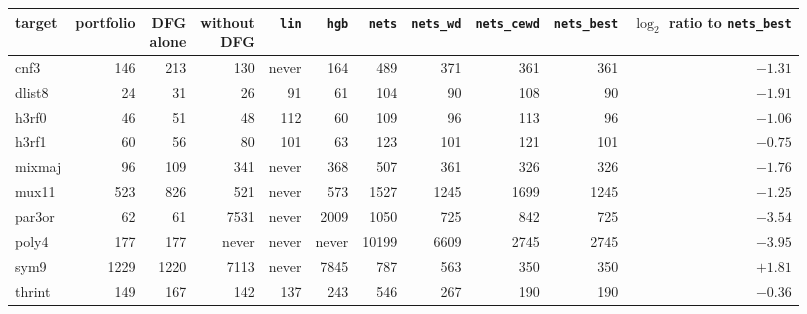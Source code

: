 \begin{tabular}{lrrrrrrrrrr}
\toprule
target & portfolio & \hd{DFG\\alone} & \hd{without\\DFG} & \texttt{lin} & \texttt{hgb} & \texttt{nets} & \texttt{nets\_wd} & \texttt{nets\_cewd} & \texttt{nets\_best} & \hd{$\log_2$ ratio to\\\texttt{nets\_best}}\\
\midrule
cnf3 & 146 & 213 & 130 & never & 164 & 489 & 371 & 361 & 361 & $-1.31$\\
dlist8 & 24 & 31 & 26 & 91 & 61 & 104 & 90 & 108 & 90 & $-1.91$\\
h3rf0 & 46 & 51 & 48 & 112 & 60 & 109 & 96 & 113 & 96 & $-1.06$\\
h3rf1 & 60 & 56 & 80 & 101 & 63 & 123 & 101 & 121 & 101 & $-0.75$\\
mixmaj & 96 & 109 & 341 & never & 368 & 507 & 361 & 326 & 326 & $-1.76$\\
mux11 & 523 & 826 & 521 & never & 573 & 1527 & 1245 & 1699 & 1245 & $-1.25$\\
par3or & 62 & 61 & 7531 & never & 2009 & 1050 & 725 & 842 & 725 & $-3.54$\\
poly4 & 177 & 177 & never & never & never & 10199 & 6609 & 2745 & 2745 & $-3.95$\\
sym9 & 1229 & 1220 & 7113 & never & 7845 & 787 & 563 & 350 & 350 & $+1.81$\\
thrint & 149 & 167 & 142 & 137 & 243 & 546 & 267 & 190 & 190 & $-0.36$\\
\bottomrule
\end{tabular}
